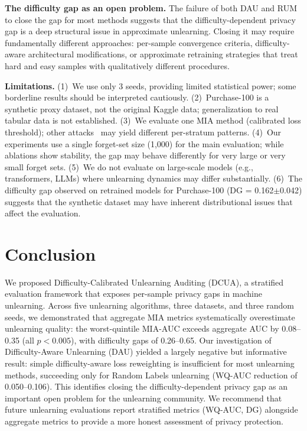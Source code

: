 \documentclass{article}
\begin{document}
\textbf{The difficulty gap as an open problem.}
The failure of both DAU and RUM to close the gap for most methods suggests that the difficulty-dependent privacy gap is a deep structural issue in approximate unlearning.
Closing it may require fundamentally different approaches: per-sample convergence criteria, difficulty-aware architectural modifications, or approximate retraining strategies that treat hard and easy samples with qualitatively different procedures.

\textbf{Limitations.}
(1)~We use only 3 seeds, providing limited statistical power; some borderline results should be interpreted cautiously.
(2)~Purchase-100 is a synthetic proxy dataset, not the original Kaggle data; generalization to real tabular data is not established.
(3)~We evaluate one MIA method (calibrated loss threshold); other attacks~\citep{carlini2022membership,he2024difficulty} may yield different per-stratum patterns.
(4)~Our experiments use a single forget-set size (1,000) for the main evaluation; while ablations show stability, the gap may behave differently for very large or very small forget sets.
(5)~We do not evaluate on large-scale models (e.g., transformers, LLMs) where unlearning dynamics may differ substantially.
(6)~The difficulty gap observed on retrained models for Purchase-100 (DG = 0.162$\pm$0.042) suggests that the synthetic dataset may have inherent distributional issues that affect the evaluation.

\section{Conclusion}
\label{sec:conclusion}

We proposed Difficulty-Calibrated Unlearning Auditing (DCUA), a stratified evaluation framework that exposes per-sample privacy gaps in machine unlearning.
Across five unlearning algorithms, three datasets, and three random seeds, we demonstrated that aggregate MIA metrics systematically overestimate unlearning quality: the worst-quintile MIA-AUC exceeds aggregate AUC by 0.08--0.35 (all $p < 0.005$), with difficulty gaps of 0.26--0.65.
Our investigation of Difficulty-Aware Unlearning (DAU) yielded a largely negative but informative result: simple difficulty-aware loss reweighting is insufficient for most unlearning methods, succeeding only for Random Labels unlearning (WQ-AUC reduction of 0.050--0.106).
This identifies closing the difficulty-dependent privacy gap as an important open problem for the unlearning community.
We recommend that future unlearning evaluations report stratified metrics (WQ-AUC, DG) alongside aggregate metrics to provide a more honest assessment of privacy protection.
\end{document}

